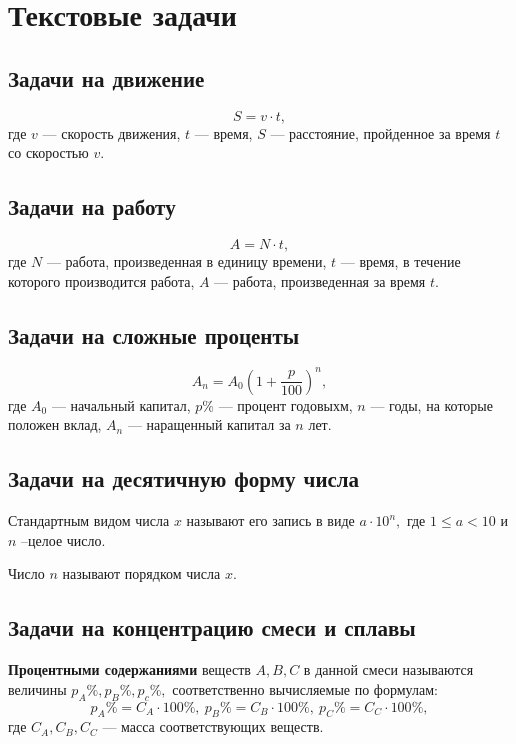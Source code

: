 \documentclass[a5paper, 8pt]{extarticle}
\begin{document}
\section{Текстовые задачи}
\subsection{Задачи на движение}
$$S=v\cdot t,$$
где $v$ --- скорость движения, $t$ --- время, $S$ --- расстояние, пройденное за время $t$ со скоростью $v.$
\subsection{Задачи на работу}
$$A=N\cdot t,$$
где $N$ --- работа, произведенная в единицу времени, $t$ --- время, в течение которого производится работа, $A$ --- работа, произведенная за время $t.$
\subsection{Задачи на сложные проценты}
$$A_n=A_0\left( 1+\frac{p}{100}\right)^n ,$$
где $A_0$ --- начальный капитал, $p\%$ --- процент годовыхм, $n$ --- годы, на которые положен вклад, $A_n$ --- наращенный капитал за $n$ лет. 
\subsection{Задачи на десятичную форму числа}
Стандартным видом числа $x$ называют его запись в виде $a\cdot 10^n,$ где $1\le a < 10$ и $n$ --целое число.

Число $n$ называют порядком числа $x.$ 

\subsection{Задачи на концентрацию смеси и сплавы}
\textbf{Процентными содержаниями} веществ $A, B, C$ в данной смеси называются величины $p_A\%, p_B\%, p_c\%,$ соответственно вычисляемые по формулам:
$$
p_A\%=C_A\cdot 100\%,\  p_B\%=C_B\cdot 100\%,\ p_C\%=C_C\cdot 100\%,
$$
где $C_A, C_B, C_C$ --- масса соответствующих веществ.
\end{document}
